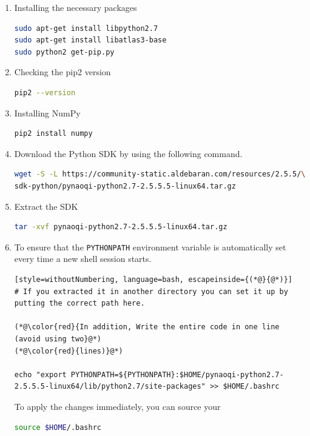 \documentclass{CSSRforAfrica}
\begin{document}
{{\begin{enumerate}
\item Installing the necessary packages

\begin{lstlisting}[style=withoutNumbering, language=bash]
sudo apt-get install libpython2.7
sudo apt-get install libatlas3-base 
sudo python2 get-pip.py
\end{lstlisting}

\item Checking the pip2 version
\begin{lstlisting}[style=withoutNumbering, language=bash]
pip2 --version
\end{lstlisting}

\item Installing NumPy
\begin{lstlisting}[style=withoutNumbering, language=bash]
pip2 install numpy
\end{lstlisting}

\item Download the Python SDK by using the following command. 
\begin{lstlisting}[style=withoutNumbering, language=bash]
wget -S -L https://community-static.aldebaran.com/resources/2.5.5/\
sdk-python/pynaoqi-python2.7-2.5.5.5-linux64.tar.gz
\end{lstlisting}

\item Extract the SDK
\begin{lstlisting}[style=withoutNumbering, language=bash]
tar -xvf pynaoqi-python2.7-2.5.5.5-linux64.tar.gz
\end{lstlisting}

\item To ensure that the \texttt{PYTHONPATH} environment variable is automatically set every time a new shell session starts. 

\begin{lstlisting}[style=withoutNumbering, language=bash, escapeinside={(*@}{@*)}]
# If you extracted it in another directory you can set it up by putting the correct path here. 

(*@\color{red}{In addition, Write the entire code in one line (avoid using two}@*)
(*@\color{red}{lines)}@*)

echo "export PYTHONPATH=${PYTHONPATH}:$HOME/pynaoqi-python2.7-2.5.5.5-linux64/lib/python2.7/site-packages" >> $HOME/.bashrc
\end{lstlisting}


To apply the changes immediately, you can source your 
\begin{lstlisting}[style=withoutNumbering, language=bash]
source $HOME/.bashrc
\end{lstlisting}
\end{enumerate}
}
}
\end{document}
